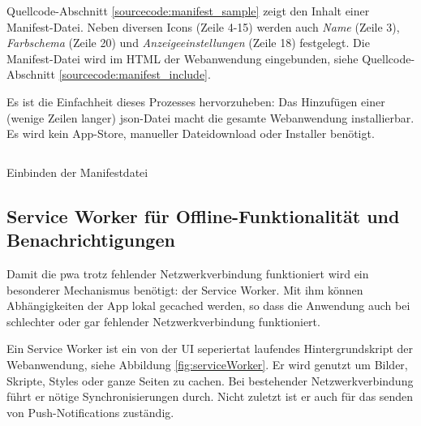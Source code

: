 Quellcode-Abschnitt \ref{sourcecode:manifest_sample} zeigt den Inhalt einer Manifest-Datei. Neben diversen Icons (Zeile 4-15) werden auch \textit{Name} (Zeile 3), \textit{Farbschema} (Zeile 20) und \textit{Anzeigeeinstellungen} (Zeile 18) festgelegt.
Die Manifest-Datei wird im HTML der Webanwendung eingebunden, siehe Quellcode-Abschnitt \ref{sourcecode:manifest_include}. 

Es ist die Einfachheit dieses Prozesses hervorzuheben: Das Hinzufügen einer (wenige Zeilen langer) \ac{json}-Datei macht die gesamte Webanwendung installierbar. Es wird kein App-Store, manueller Dateidownload oder Installer benötigt. 

\begin{listing}[H]
    \inputminted{xml}{sourcecode/include_manifest.html}
    \caption{Einbinden der Manifestdatei}
      \label{sourcecode:manifest_include}
\end{listing}



\subsection{Service Worker für Offline-Funktionalität und Benachrichtigungen}
\label{chap:service_worker}

Damit die \ac{pwa} trotz fehlender Netzwerkverbindung funktioniert wird ein besonderer Mechanismus benötigt: der Service Worker. Mit ihm können Abhängigkeiten der App lokal gecached werden, so dass die Anwendung auch bei schlechter oder gar fehlender Netzwerkverbindung funktioniert. \cite[S. 7]{BeginningPWA}

Ein Service Worker ist ein von der UI seperiertat laufendes Hintergrundskript der Webanwendung, siehe Abbildung \ref{fig:serviceWorker}. Er wird genutzt um Bilder, Skripte, Styles oder ganze Seiten zu cachen. Bei bestehender Netzwerkverbindung führt er nötige Synchronisierungen durch. Nicht zuletzt ist er auch für das senden von Push-Notifications zuständig. \cite[S. 24]{BeginningPWA}

